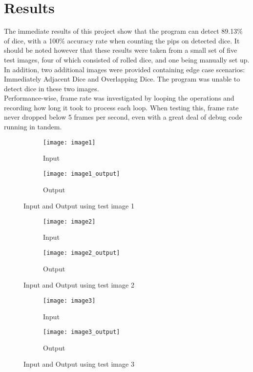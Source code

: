 \documentclass[journal]{IEEEtran}
\begin{document}
\section{Results}
The immediate results of this project show that the program can detect 89.13\% of dice, with a 100\% accuracy rate when counting the pips on detected dice. It should be noted however that these results were taken from a small set of five test images, four of which consisted of rolled dice, and one being manually set up. In addition, two additional images were provided containing edge case scenarios: Immediately Adjacent Dice and Overlapping Dice. The program was unable to detect dice in these two images.\\

Performance-wise, frame rate was investigated by looping the operations and recording how long it took to process each loop. When testing this, frame rate never dropped below 5 frames per second, even with a great deal of debug code running in tandem.\\



\begin{figure}
	\centering
	\begin{subfigure}{.25\textwidth}
		\centering
		\texttt{[image: image1]}
		\caption{Input}
		\label{fig:results1_sub1}
	\end{subfigure}%
	\begin{subfigure}{.25\textwidth}
		\centering
		\texttt{[image: image1\_output]}
		\caption{Output}
		\label{fig:results1_sub2}
	\end{subfigure}
	\caption{Input and Output using test image 1}
	\label{fig:results1}
\end{figure}


\begin{figure}
	\centering
	\begin{subfigure}{.25\textwidth}
		\centering
		\texttt{[image: image2]}
		\caption{Input}
		\label{fig:results2_sub1}
	\end{subfigure}%
	\begin{subfigure}{.25\textwidth}
		\centering
		\texttt{[image: image2\_output]}
		\caption{Output}
		\label{fig:results2_sub2}
	\end{subfigure}
	\caption{Input and Output using test image 2}
	\label{fig:results2}
\end{figure}


\begin{figure}
	\centering
	\begin{subfigure}{.25\textwidth}
		\centering
		\texttt{[image: image3]}
		\caption{Input}
		\label{fig:results3_sub1}
	\end{subfigure}%
	\begin{subfigure}{.25\textwidth}
		\centering
		\texttt{[image: image3\_output]}
		\caption{Output}
		\label{fig:results3_sub2}
	\end{subfigure}
	\caption{Input and Output using test image 3}
	\label{fig:results3}
\end{figure}
\end{document}
